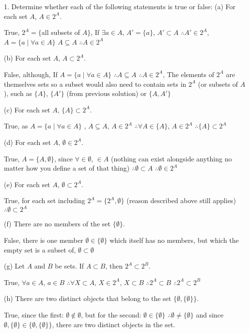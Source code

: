 1. Determine whether each of the following statements is true or false:
(a) For each set $A$, $A \in 2^{A}$.

True, $2^{A} = \{$all subsets of $A \}$, If $\exists  a \in A$, $ A' = \{a\}$, $ A' \subset A$  $\therefore A' \in 2^{A}$, $A = \{a \mid \forall a \in A \}$ $A \subseteq A$  $\therefore A \in 2^A$

(b) For each set $A$, $A \subset 2^{A}$.

False, although,  If $A = \{a \mid \forall a \in A \}$ $\therefore A \subseteq A$  $\therefore A \in 2^{A}$, The elements of $2^{A}$ are themselves sets so a subset would also need to contain sets in $2^{A}$ (or subsets of $A$), such as $\{ A\}$,  $\{A'\}$ (from previous solution) or $\{ A, A'\}$

(c) For each set $A$, $\{A\} \subset 2^{A}$.

True, as $A = \{a \mid \forall a \in A \}$ , $A \subseteq  A$, $A \in 2^{A}$ $\therefore \forall A\in \{A\} $,  $A \in 2^{A}$  $\therefore \{ A\} \subset 2^{A}$

(d) For each set $A$, $\emptyset \in 2^{A}$.

True, $A = \{A, \emptyset \}$, since $\forall  \in \emptyset$, $ \in A$ (nothing can exist alongside anything no matter how you define a set of that thing) $\therefore \emptyset \subset A$ $\therefore \emptyset \in 2^{A}$

(e) For each set $A$, $\emptyset \subset 2^{A}$.

True, for each set including  $2^{A} = \{2^{A},\emptyset \}$ (reason described above still applies) $\therefore \emptyset \subset 2^{A}$

(f) There are no members of the set $\{ \emptyset \}$. 

False, there is one member $\emptyset \in \{ \emptyset \}$ which itself has no members, but which the empty set is a subset of, $\emptyset \subset \emptyset$

(g) Let $A$ and $B$ be sets. If $A \subset B$, then $2^{A} \subset 2^{B}$.

True, $\forall a \in A$, $a \in B$ $\therefore \forall X \subset A$, $X \in 2^{A}$, $X \subset B$ $\therefore 2^{A} \subset B$ $\therefore 2^{A} \subset 2^{B}$

(h) There are two distinct objects that belong to the set $\{\emptyset, \{\emptyset\}\}$.

True, since the first: $\emptyset \not \in  \emptyset$, but for the second: $\emptyset \in \{ \emptyset\}$ $\therefore \emptyset \not = \{ \emptyset \}$ and since $\emptyset, \{\emptyset\} \in \{\emptyset, \{\emptyset\}\}$, there are two distinct objects in the set.

